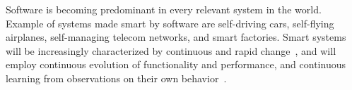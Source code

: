 \documentclass[12pt]{article}
\begin{document}
Software is becoming predominant in every relevant system in the world.
Example of systems made smart by software are 
self-driving cars, self-flying
airplanes, self-managing telecom networks, and smart
factories. 
Smart systems will be increasingly characterized by continuous and rapid change~\cite{Mens2008}, and
will employ continuous evolution of functionality and performance, and continuous learning 
from observations on their own
behavior~\cite{Bosch2016}. 
\end{document}
